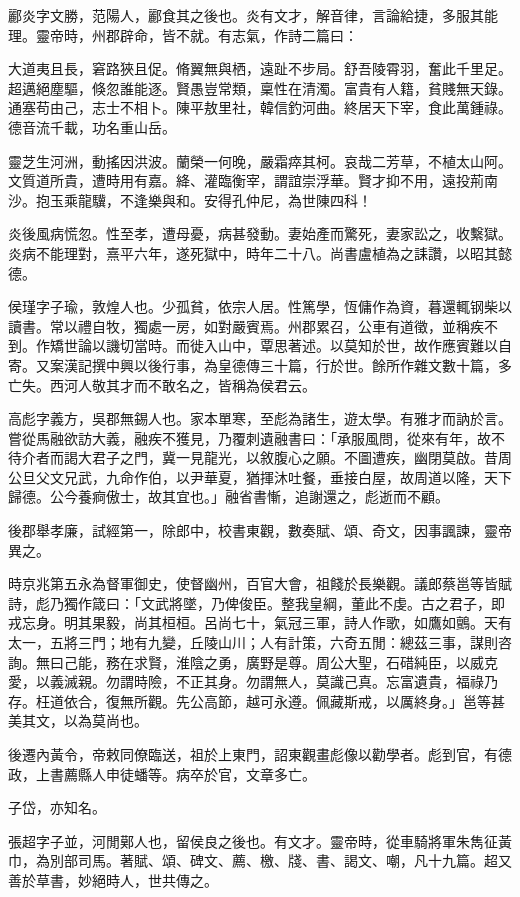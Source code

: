 \begin{pinyinscope}
酈炎字文勝，范陽人，酈食其之後也。炎有文才，解音律，言論給捷，多服其能理。靈帝時，州郡辟命，皆不就。有志氣，作詩二篇曰：

大道夷且長，窘路狹且促。脩翼無與栖，遠趾不步局。舒吾陵霄羽，奮此千里足。超邁絕塵驅，倏忽誰能逐。賢愚豈常類，稟性在清濁。富貴有人籍，貧賤無天錄。通塞苟由己，志士不相卜。陳平敖里社，韓信釣河曲。終居天下宰，食此萬鍾祿。德音流千載，功名重山岳。

靈芝生河洲，動搖因洪波。蘭榮一何晚，嚴霜瘁其柯。哀哉二芳草，不植太山阿。文質道所貴，遭時用有嘉。絳、灌臨衡宰，謂誼崇浮華。賢才抑不用，遠投荊南沙。抱玉乘龍驥，不逢樂與和。安得孔仲尼，為世陳四科！

炎後風病慌忽。性至孝，遭母憂，病甚發動。妻始產而驚死，妻家訟之，收繫獄。炎病不能理對，熹平六年，遂死獄中，時年二十八。尚書盧植為之誄讚，以昭其懿德。

侯瑾字子瑜，敦煌人也。少孤貧，依宗人居。性篤學，恆傭作為資，暮還輒钢柴以讀書。常以禮自牧，獨處一房，如對嚴賓焉。州郡累召，公車有道徵，並稱疾不到。作矯世論以譏切當時。而徙入山中，覃思著述。以莫知於世，故作應賓難以自寄。又案漢記撰中興以後行事，為皇德傳三十篇，行於世。餘所作雜文數十篇，多亡失。西河人敬其才而不敢名之，皆稱為侯君云。

高彪字義方，吳郡無錫人也。家本單寒，至彪為諸生，遊太學。有雅才而訥於言。嘗從馬融欲訪大義，融疾不獲見，乃覆刺遺融書曰：「承服風問，從來有年，故不待介者而謁大君子之門，冀一見龍光，以敘腹心之願。不圖遭疾，幽閉莫啟。昔周公旦父文兄武，九命作伯，以尹華夏，猶揮沐吐餐，垂接白屋，故周道以隆，天下歸德。公今養痾傲士，故其宜也。」融省書慚，追謝還之，彪逝而不顧。

後郡舉孝廉，試經第一，除郎中，校書東觀，數奏賦、頌、奇文，因事諷諫，靈帝異之。

時京兆第五永為督軍御史，使督幽州，百官大會，祖餞於長樂觀。議郎蔡邕等皆賦詩，彪乃獨作箴曰：「文武將墜，乃俾俊臣。整我皇綱，董此不虔。古之君子，即戎忘身。明其果毅，尚其桓桓。呂尚七十，氣冠三軍，詩人作歌，如鷹如鸇。天有太一，五將三門；地有九變，丘陵山川；人有計策，六奇五閒：總茲三事，謀則咨詢。無曰己能，務在求賢，淮陰之勇，廣野是尊。周公大聖，石碏純臣，以威克愛，以義滅親。勿謂時險，不正其身。勿謂無人，莫識己真。忘富遺貴，福祿乃存。枉道依合，復無所觀。先公高節，越可永遵。佩藏斯戒，以厲終身。」邕等甚美其文，以為莫尚也。

後遷內黃令，帝敕同僚臨送，祖於上東門，詔東觀畫彪像以勸學者。彪到官，有德政，上書薦縣人申徒蟠等。病卒於官，文章多亡。

子岱，亦知名。

張超字子並，河閒鄚人也，留侯良之後也。有文才。靈帝時，從車騎將軍朱雋征黃巾，為別部司馬。著賦、頌、碑文、薦、檄、牋、書、謁文、嘲，凡十九篇。超又善於草書，妙絕時人，世共傳之。


\end{pinyinscope}
